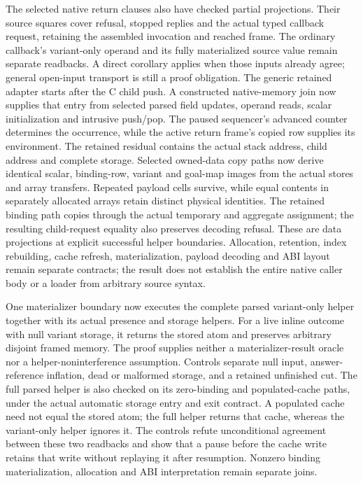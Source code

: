 \documentclass[11pt,a4paper]{article}
\begin{document}
The selected native return clauses also have checked partial projections.
Their source squares cover refusal, stopped replies and the actual typed
callback request, retaining the assembled invocation and reached frame.
The ordinary callback's variant-only operand and its fully materialized
source value remain separate readbacks. A direct corollary applies when
those inputs already agree; general open-input transport is still a proof
obligation. The generic retained adapter starts after the C child push. A
constructed native-memory join now supplies that entry from selected parsed
field updates, operand reads, scalar initialization and intrusive push/pop.
The paused sequencer's advanced counter determines the occurrence, while the
active return frame's copied row supplies its environment. The retained
residual contains the actual stack address, child address and complete
storage. Selected owned-data copy paths now derive identical scalar,
binding-row, variant and goal-map images from the actual stores and array
transfers. Repeated payload cells survive, while equal contents in separately
allocated arrays retain distinct physical identities. The retained binding
path copies through the actual temporary and aggregate assignment; the
resulting child-request equality also preserves decoding refusal. These are
data projections at explicit successful helper boundaries. Allocation,
retention, index rebuilding, cache refresh, materialization, payload decoding
and ABI layout remain separate contracts; the result does not establish the
entire native caller body or a loader from arbitrary source syntax.

One materializer boundary now executes the complete parsed variant-only
helper together with its actual presence and storage helpers. For a live
inline outcome with null variant storage, it returns the stored atom and
preserves arbitrary disjoint framed memory. The proof supplies neither a
materializer-result oracle nor a helper-noninterference assumption. Controls
separate null input, answer-reference inflation, dead or malformed storage,
and a retained unfinished cut. The full parsed helper is also checked on
its zero-binding and populated-cache paths, under the actual automatic
storage entry and exit contract. A populated cache need not equal the stored
atom; the full helper returns that cache, whereas the variant-only helper
ignores it. The controls refute unconditional agreement between these two
readbacks and show that a pause before the cache write retains that write
without replaying it after resumption. Nonzero binding materialization,
allocation and ABI interpretation remain separate joins.
\end{document}

